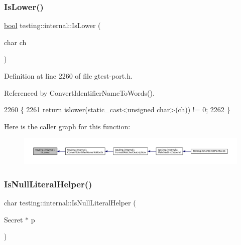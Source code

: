 \subsubsection{\texorpdfstring{Is\+Lower()}{IsLower()}}
{\footnotesize\ttfamily \hyperlink{classbool}{bool} testing\+::internal\+::\+Is\+Lower (\begin{DoxyParamCaption}\item[{char}]{ch }\end{DoxyParamCaption})\hspace{0.3cm}{\ttfamily [inline]}}



Definition at line 2260 of file gtest-\/port.\+h.



Referenced by Convert\+Identifier\+Name\+To\+Words().


\begin{DoxyCode}
2260                              \{
2261   \textcolor{keywordflow}{return} islower(static\_cast<unsigned char>(ch)) != 0;
2262 \}
\end{DoxyCode}
Here is the caller graph for this function\+:
\nopagebreak
\begin{figure}[H]
\begin{center}
\leavevmode
\includegraphics[width=350pt]{namespacetesting_1_1internal_ac26ce3883bc8919c27074975e958f3b7_icgraph}
\end{center}
\end{figure}
\mbox{\label{namespacetesting_1_1internal_afb0731ba39ffef1fa1730ac0699c9025}} 
\subsubsection{\texorpdfstring{Is\+Null\+Literal\+Helper()}{IsNullLiteralHelper()}\hspace{0.1cm}{\footnotesize\ttfamily [1/2]}}
{\footnotesize\ttfamily char testing\+::internal\+::\+Is\+Null\+Literal\+Helper (\begin{DoxyParamCaption}\item[{Secret $\ast$}]{p }\end{DoxyParamCaption})}

